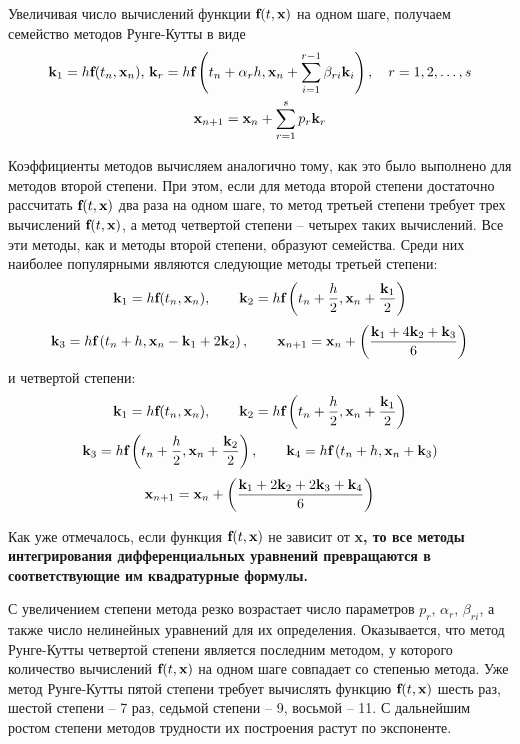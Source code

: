 Увеличивая число вычислений функции $\bf{f}(t, \bf{x})$ на одном шаге, получаем семейство методов Рунге-Кутты в виде
\begin{gather*}
    \bf{k}_1 = h\bf{f}(t_n, \bf{x}_n), \, \bf{k}_r = h\bf{f}\left( t_n + \alpha_r h, \bf{x}_n + \sum_{i=1}^{r-1} \beta_{ri}\bf{k}_i \right), \quad r=1,2,\ldots,s\\
    \bf{x}_{n+1} = \bf{x}_n + \sum_{r=1}^{s} p_r \bf{k}_r
\end{gather*}

Коэффициенты методов вычисляем аналогично тому, как это было выполнено для методов второй степени. При этом, если для
метода второй степени достаточно рассчитать $\bf{f}(t, \bf{x})$ два раза на одном шаге, то метод третьей степени
требует трех вычислений $\bf{f}(t, \bf{x})$, а метод четвертой степени -- четырех таких вычислений. Все эти методы,
как и методы второй степени, образуют семейства. Среди них наиболее популярными являются следующие методы третьей степени:
\begin{equation*}
    \bf{k}_1 = h\bf{f}(t_n, \bf{x}_n), \qquad \bf{k}_2 = h\bf{f}\left( t_n + \frac{h}{2}, \bf{x}_n + \frac{\bf{k}_1}{2} \right)
\end{equation*}
\begin{equation}
    \bf{k}_3 = h\bf{f}\left( t_n + h, \bf{x}_n - \bf{k}_1 + 2\bf{k}_2 \right), \qquad \bf{x}_{n+1} = \bf{x}_n + \left( \frac{\bf{k}_1 + 4\bf{k}_2 + \bf{k}_3}{6} \right)
\end{equation}
и четвертой степени:
\begin{gather*}
    \bf{k}_1 = h\bf{f}(t_n, \bf{x}_n), \qquad \bf{k}_2 = h\bf{f}\left( t_n + \frac{h}{2}, \bf{x}_n + \frac{\bf{k}_1}{2}\right) \\
    \bf{k}_3 = h\bf{f}\left( t_n + \frac{h}{2}, \bf{x}_n + \frac{\bf{k}_2}{2} \right), \qquad \bf{k}_4 = h\bf{f}\left( t_n + h, \bf{x}_n + \bf{k}_3 \right)
\end{gather*}
\begin{equation}
    \bf{x}_{n+1} = \bf{x}_n + \left( \frac{\bf{k}_1 + 2\bf{k}_2 + 2\bf{k}_3 + \bf{k}_4}{6} \right)
\end{equation}

Как уже отмечалось, если функция $\bf{f}(t, \bf{x})$ не зависит от \bf{x}, то все методы интегрирования
дифференциальных уравнений превращаются в соответствующие им квадратурные формулы.

С увеличением степени метода резко возрастает число параметров $p_r, \, \alpha_r, \, \beta_{ri}$, а также число
нелинейных уравнений для их определения. Оказывается, что метод Рунге-Кутты четвертой степени является последним
методом, у которого количество вычислений $\bf{f}(t, \bf{x})$ на одном шаге совпадает со степенью метода. Уже метод
Рунге-Кутты пятой степени требует вычислять функцию $\bf{f}(t, \bf{x})$ шесть раз, шестой степени -- 7 раз, седьмой
степени -- 9, восьмой -- 11. С дальнейшим ростом степени методов трудности их построения растут по экспоненте.

